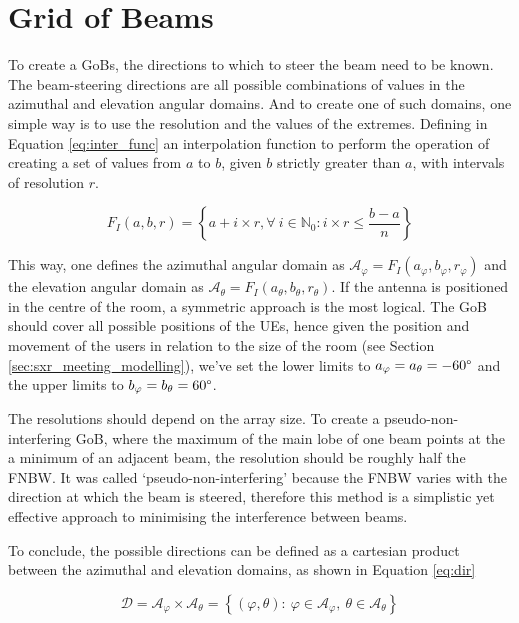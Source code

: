 \section{Grid of Beams}
\label{sec:GoB}


To create a GoBs, the directions to which to steer the beam need to be known. The beam-steering directions are all possible combinations of values in the azimuthal and elevation angular domains. And to create one of such domains, one simple way is to use the resolution and the values of the extremes. Defining in Equation \eqref{eq:inter_func} an interpolation function to perform the operation of creating a set of values from $a$ to $b$, given $b$ strictly greater than $a$, with intervals of resolution $r$.

\begin{equation} \label{eq:inter_func}
    F_I(a, b, r) = \left\{a + i \times r, \forall \ i \in \mathbb{N}_0: i \times r \leq \frac{b-a}{n} \right\}
\end{equation}

This way, one defines the azimuthal angular domain as $\mathcal{A}_\varphi = F_I(a_\varphi, b_\varphi, r_\varphi)$ and the elevation angular domain as $\mathcal{A}_\theta = F_I(a_\theta, b_\theta, r_\theta)$. If the antenna is positioned in the centre of the room, a symmetric approach is the most logical. The GoB should cover all possible positions of the UEs, hence given the position and movement of the users in relation to the size of the room (see Section \ref{sec:sxr_meeting_modelling}), we've set the lower limits to $a_\varphi = a_\theta = -60\text{\textdegree}$ and the upper limits to $b_\varphi = b_\theta = 60\text{\textdegree}$. 

The resolutions should depend on the array size. To create a pseudo-non-interfering GoB, where the maximum of the main lobe of one beam points at the a minimum of an adjacent beam, the resolution should be roughly half the \ac{FNBW}. It was called `pseudo-non-interfering' because the \ac{FNBW} varies with the direction at which the beam is steered, therefore this method is a simplistic yet effective approach to minimising the interference between beams. 

To conclude, the possible directions can be defined as a cartesian product between the azimuthal and elevation domains, as shown in Equation \eqref{eq:dir}

\begin{equation} \label{eq:dir}
    \mathcal{D} = \mathcal{A}_\varphi \times \mathcal{A}_\theta = \left\{(\varphi, \theta) : \ \varphi \in \mathcal{A}_\varphi , \ \theta \in \mathcal{A}_\theta\right\}
\end{equation}

